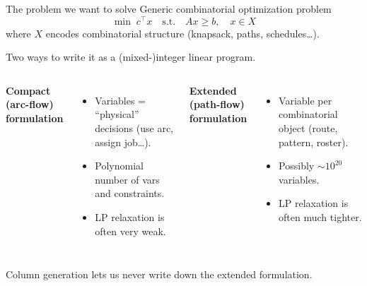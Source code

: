 \documentclass[10pt,aspectratio=169]{beamer}
\newcommand{\transpose}{^{\!\top}}
\begin{document}
\begin{frame}{The problem we want to solve}
  Generic combinatorial optimization problem
  \[
     \min \; c\transpose x \quad \text{s.t.}\quad Ax \ge b,\quad x\in X
  \]
  where $X$ encodes \alert{combinatorial structure} (knapsack, paths, schedules\dots).

  \medskip

  Two ways to write it as a (mixed-)integer linear program.
  \begin{columns}[T,onlytextwidth]
    \textbf{Compact (arc-flow) formulation}
    \begin{itemize}\small
      \item Variables = ``physical'' decisions (use arc, assign job\dots).
      \item Polynomial number of vars and constraints.
      \item LP relaxation is often \alert{very weak}.
    \end{itemize}
    \textbf{Extended (path-flow) formulation}
    \begin{itemize}\small
      \item Variable per \alert{combinatorial object} (route, pattern, roster).
      \item Possibly $\sim\!10^{20}$ variables.
      \item LP relaxation is often \alert{much tighter}.
    \end{itemize}
  \end{columns}
  \vfill
  Column generation lets us \alert{never write down} the extended formulation.
\end{frame}
\end{document}
